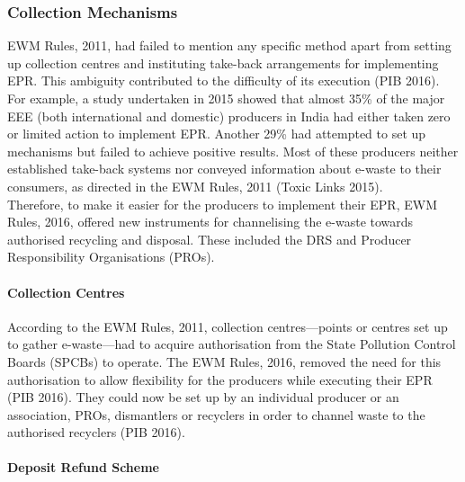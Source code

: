\documentclass[a4paper, 12pt]{article}
\begin{document}
                    \subsubsection{Collection Mechanisms}
                    
                    EWM Rules, 2011, had failed to mention any specific method apart from setting up collection centres and instituting take-back arrangements for implementing EPR. This ambiguity contributed to the difficulty of its execution (PIB 2016). For example, a study undertaken in 2015 showed that almost 35\% of the major EEE (both international and domestic) producers in India had either taken zero or limited action to implement EPR. Another 29\% had attempted to set up mechanisms but failed to achieve positive results. Most of these producers neither established take-back systems nor conveyed information about e-waste to their consumers, as directed in the EWM Rules, 2011 (Toxic Links 2015). \\
                    
                    Therefore, to make it easier for the producers to implement their EPR, EWM Rules, 2016, offered new instruments for channelising the e-waste towards authorised recycling and disposal. These included the DRS and Producer Responsibility Organisations (PROs). \\
                    
                    \paragraph{Collection Centres}
                    
                    According to the EWM Rules, 2011, collection centres—points or centres set up to gather e-waste—had to acquire authorisation from the State Pollution Control Boards (SPCBs) to operate. The EWM Rules, 2016, removed the need for this authorisation to allow flexibility for the producers while executing their EPR (PIB 2016). They could now be set up by an individual producer or an association, PROs, dismantlers or recyclers in order to channel waste to the authorised recyclers (PIB 2016). \\
                    
                    \paragraph{Deposit Refund Scheme}
                    
\end{document}
